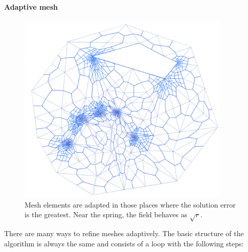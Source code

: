 \documentclass[]{pracamgr}
\begin{document}
      \paragraph{Adaptive mesh}

        \begin{figure}[H]
          \centering
          \includegraphics[width=0.9\textwidth]{figs/adaptive_refinment.png}        
          \caption{Mesh elements are adapted in those places where the solution error is the greatest. Near the spring, the field behaves as $\sqrt{r}$.}
          \label{adaptive_refinment}
        \end{figure}

        There are many ways to refine meshes adaptively. The basic structure of the algorithm is always the same and consists of a loop with the following steps:
\end{document}

